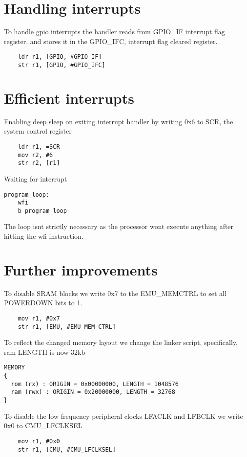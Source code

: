 \section{Handling interrupts}

To handle gpio interrupts the handler reads from GPIO\_IF interrupt flag register, and stores it in the GPIO\_IFC, interrupt flag cleared register.

\begin{lstlisting}
	ldr r1, [GPIO, #GPIO_IF]	
	str r1, [GPIO, #GPIO_IFC]	
\end{lstlisting}


\section{Efficient interrupts}

Enabling deep sleep on exiting interrupt handler by writing 0x6 to SCR, the system control register 

\begin{lstlisting}
	ldr r1, =SCR
	mov r2, #6
	str r2, [r1]	
\end{lstlisting}

Waiting for interrupt

\begin{lstlisting}
program_loop:
 	wfi
	b program_loop  	
\end{lstlisting}

The loop isnt strictly necessary as the processor wont execute anything after hitting the wfi instruction.

\section{Further improvements}

To disable SRAM blocks we write 0x7 to the EMU\_MEMCTRL to set all POWERDOWN bits to 1.

\begin{lstlisting}
	mov r1, #0x7
	str r1, [EMU, #EMU_MEM_CTRL]
\end{lstlisting}

To reflect the changed memory layout we change the linker script, specifically, ram LENGTH is now 32kb

\begin{lstlisting}
MEMORY
{
  rom (rx) : ORIGIN = 0x00000000, LENGTH = 1048576
  ram (rwx) : ORIGIN = 0x20000000, LENGTH = 32768
}
\end{lstlisting}

To disable the low frequency peripheral clocks LFACLK and LFBCLK we write 0x0 to CMU\_LFCLKSEL

\begin{lstlisting}
	mov r1, #0x0
	str r1, [CMU, #CMU_LFCLKSEL]
\end{lstlisting}
